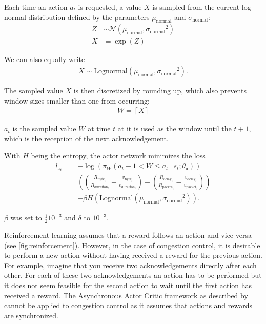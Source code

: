 \documentclass[sigconf]{acmart}
\newcommand\givenbase[1][]{\:#1\lvert\:}
\let\given\givenbase
\begin{document}
Each time an action $a_t$ is requested, a value $X$ is sampled from the current log-normal distribution defined by the parameters $\mu_\text{normal}$ and $\sigma_\text{normal}$: 
\begin{align*}
Z&\sim {\mathcal {N}}(\mu_\text{normal} ,{\sigma_{\text{normal}}}^{2})\\
X&=\exp(Z)
\end{align*}

We can also equally write
\begin{align*}
X \sim \text{Lognormal}\left( \mu_\text{normal}, {\sigma_{\text{normal}}}^{2}\right).
\end{align*}

The sampled value $X$ is then discretized by rounding up, which also prevents window sizes smaller than one from occurring:
\begin{align*}
W = \left\lceil X \right\rceil
\end{align*}

$a_t$ is the sampled value $W$ at time $t$ at it is used as the window until the $t+1$, which is the reception of the next acknowledgement. 


With $H$ being the entropy, the actor network minimizes the loss
\begin{align*}
l_{\text{a}_t} =& -\log \left( \pi_W\left( a_t-1 < W \leq a_t \given s_t; \theta_\text{a} \right)\right)\\
&\left( \left(\frac{R_{\text{byte}_t}}{{R_{\text{duration}_t}}} - \frac{v_{\text{byte}_t}}{{v_{\text{duration}_t}}}\right) - \left( \frac{R_{\text{delay}_t}}{{R_{\text{packet}_t}}}- \frac{v_{\text{delay}_t}}{{v_{\text{packet}_t}}} \right)\right)\\ 
&+ \beta H\left(\text{Lognormal}\left( \mu_\text{normal}, {\sigma_{\text{normal}}}^{2}\right) \right).
\end{align*}

$\beta$ was set to $\frac 1 2 10^{-3}$ and $\delta$ to $10^{-3}$.

Reinforcement learning assumes that a reward follows an action and vice-versa (see \autoref{fig:reinforcement}). However, in the case of congestion control, it is desirable to perform a new action without having received a reward for the previous action. For example, imagine that you receive two acknowledgements directly after each other. For each of these two acknowledgements an action has to be performed but it does not seem feasible for the second action to wait until the first action has received a reward. The Asynchronous Actor Critic framework as described by \cite{mnih_asynchronous_2016} cannot be applied to congestion control as it assumes that actions and rewards are synchronized.
\end{document}
